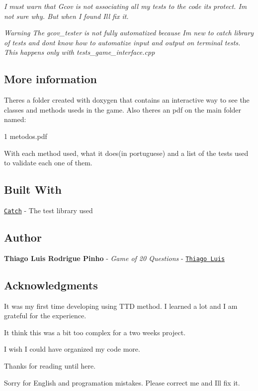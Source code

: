 {\itshape I must warn that Gcov is not associating all my tests to the code its protect. I\textquotesingle{}m not sure why. But when I found I\textquotesingle{}ll fix it.}

{\itshape Warning The gcov\+\_\+tester is not fully automatized because I\textquotesingle{}m new to catch library of tests and don\textquotesingle{}t know how to automatize input and output on terminal tests. This happens only with tests\+\_\+game\+\_\+interface.\+cpp}

\subsection*{More information}

There\textquotesingle{}s a folder created with doxygen that contains an interactive way to see the classes and methods useds in the game. Also there\textquotesingle{}s an pdf on the main folder named\+: 
\begin{DoxyCode}
1 metodos.pdf
\end{DoxyCode}
 With each method used, what it does(in portuguese) and a list of the tests used to validate each one of them. \subsection*{Built With}


\begin{DoxyItemize}
\item \href{http://catch-lib.net/}{\tt Catch} -\/ The test library used
\end{DoxyItemize}

\subsection*{Author}


\begin{DoxyItemize}
\item {\bfseries Thiago Luis Rodrigue Pinho} -\/ {\itshape Game of 20 Questions} -\/ \href{https://github.com/thiagolrpinho/MP-Trabalho-1-20perguntas}{\tt Thiago Luis}
\end{DoxyItemize}

\subsection*{Acknowledgments}


\begin{DoxyItemize}
\item It was my first time developing using T\+TD method. I learned a lot and I am grateful for the experience.
\item It think this was a bit too complex for a two weeks project.
\item I wish I could have organized my code more.
\item Thanks for reading until here.
\item Sorry for English and programation mistakes. Please correct me and I\textquotesingle{}ll fix it. 
\end{DoxyItemize}